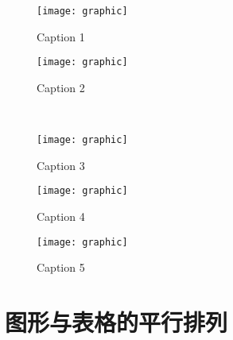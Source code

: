\begin{figure} 
	\centering 
	\begin{minipage}[b]{0.3\textwidth} 
		\centering 
		\texttt{[image: graphic]} 
		\caption{Caption 1}\label{fig:stacked:a}
	\end{minipage}%
	\hspace{0.04\textwidth}%
	\begin{minipage}[b]{0.3\textwidth} 
		\centering 
		\texttt{[image: graphic]} 
		\caption{Caption 2} \label{fig:stacked:b}
	\end{minipage}\\[20pt] 
	\begin{minipage}[b]{0.3\textwidth} 
		\centering 
		\texttt{[image: graphic]} 
		\caption{Caption 3} \label{fig:stacked:c}
	\end{minipage}%
	\hspace{0.04\linewidth}%
	\begin{minipage}[b]{0.3\textwidth} 
		\centering 
		\texttt{[image: graphic]} 
		\caption{Caption 4} \label{fig:stacked:d}
	\end{minipage}%
	\hspace{0.04\linewidth}%
	\begin{minipage}[b]{0.3\textwidth} 
		\centering 
		\texttt{[image: graphic]} 
		\caption{Caption 5} \label{fig:stacked:e}
	\end{minipage} 
\end{figure}

\section{图形与表格的平行排列}\label{sec:figuretable}


